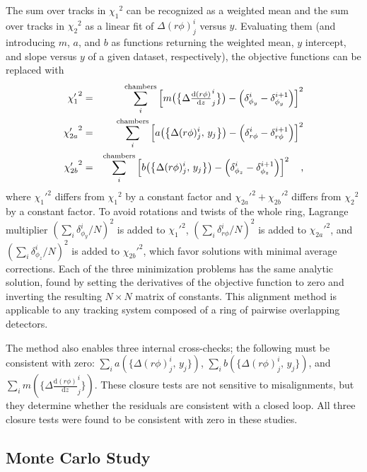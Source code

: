 \documentclass[11pt,twoside,a4paper,cmspaper]{cms-tdr}
\begin{document}
The sum over tracks in ${\chi_1}^2$ can be recognized as a weighted
mean and the sum over tracks in ${\chi_2}^2$ as a linear fit of
$\Delta (r\phi)^i_j$ versus $y$.  Evaluating them (and introducing
$m$, $a$, and $b$ as functions returning the weighted mean, $y$
intercept, and slope versus $y$ of a given dataset, respectively), the objective functions can be replaced with
\begin{eqnarray}
{\chi_1'}^2 &=& \sum_i^{\mbox{\scriptsize chambers}}
\left[m\big(\big\{\Delta \tfrac{\textrm{d}(r\phi)}{\textrm{d}z}^i_j\big\}\big)
- \left(\delta_{\phi_y}^i - \delta_{\phi_y}^{i+1}\right)\right]^2 \\
{\chi_{2a}'}^2 &=& \sum_i^{\mbox{\scriptsize chambers}}
\left[a\big(\big\{\Delta (r\phi)^i_j, \, y_j\big\}\big) - \left(\delta_{r\phi}^i
- \delta_{r\phi}^{i+1}\right)\right]^2 \nonumber \\
{\chi_{2b}'}^2 &=& \sum_i^{\mbox{\scriptsize chambers}}
\left[b\big(\big\{\Delta (r\phi)^i_j, \, y_j\big\}\big) - \left(\delta_{\phi_z}^i - \delta_{\phi_z}^{i+1}\right)\right]^2\quad\mbox{,} \nonumber
\end{eqnarray}
where ${\chi_1'}^2$ differs from ${\chi_1}^2$ by a constant factor and
${\chi_{2a}'}^2 + {\chi_{2b}'}^2$ differs from ${\chi_2}^2$ by a
constant factor.  To avoid rotations and twists of the whole ring, Lagrange multiplier
$(\sum_i \delta_{\phi_y}^i/N)^2$ is added to ${\chi_1'}^2$,
$(\sum_i \delta_{r\phi}^i/N)^2$ is added to ${\chi_{2a}'}^2$, and
$(\sum_i \delta_{\phi_z}^i/N)^2$ is added to ${\chi_{2b}'}^2$,
which favor solutions with minimal average corrections.  Each
of the three minimization problems has the same analytic solution,
found by setting the derivatives of the objective function to zero and
inverting the resulting $N\times N$ matrix of constants.  This
alignment method is applicable to any tracking system composed of a
ring of pairwise overlapping detectors.

The method also enables three internal cross-checks; the following
must be consistent with zero: $\sum_i a(\{\Delta (r\phi)^i_j, \, y_j\})$, $\sum_i
b(\{\Delta (r\phi)^i_j, \, y_j\})$, and $\sum_i m(\{\Delta \frac{\textrm{d}(r\phi)}{\textrm{d}z}^i_j\})$.  These
closure tests are not sensitive to misalignments, but they determine
whether the residuals are consistent with a closed loop.  All three
closure tests were found to be consistent with zero in these studies.

\subsection{Monte Carlo Study}
\end{document}
